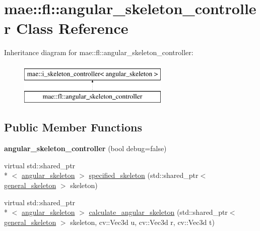 \hypertarget{classmae_1_1fl_1_1angular__skeleton__controller}{\section{mae\-:\-:fl\-:\-:angular\-\_\-skeleton\-\_\-controller Class Reference}
\label{classmae_1_1fl_1_1angular__skeleton__controller}
}
Inheritance diagram for mae\-:\-:fl\-:\-:angular\-\_\-skeleton\-\_\-controller\-:\begin{figure}[H]
\begin{center}
\leavevmode
\includegraphics[height=2.000000cm]{classmae_1_1fl_1_1angular__skeleton__controller}
\end{center}
\end{figure}
\subsection*{Public Member Functions}
\begin{DoxyCompactItemize}
\item 
\hypertarget{classmae_1_1fl_1_1angular__skeleton__controller_a83357968cdb490b9032a32e9fef2765a}{{\bfseries angular\-\_\-skeleton\-\_\-controller} (bool debug=false)}\label{classmae_1_1fl_1_1angular__skeleton__controller_a83357968cdb490b9032a32e9fef2765a}

\item 
virtual std\-::shared\-\_\-ptr\\*
$<$ \hyperlink{classmae_1_1fl_1_1angular__skeleton}{angular\-\_\-skeleton} $>$ \hyperlink{classmae_1_1fl_1_1angular__skeleton__controller_afae922566ff1d48db88538bd4b0c0d19}{specified\-\_\-skeleton} (std\-::shared\-\_\-ptr$<$ \hyperlink{classmae_1_1general__skeleton}{general\-\_\-skeleton} $>$ skeleton)
\item 
virtual std\-::shared\-\_\-ptr\\*
$<$ \hyperlink{classmae_1_1fl_1_1angular__skeleton}{angular\-\_\-skeleton} $>$ \hyperlink{classmae_1_1fl_1_1angular__skeleton__controller_a8ef9c285e21b340faad2b1304cd25c4e}{calculate\-\_\-angular\-\_\-skeleton} (std\-::shared\-\_\-ptr$<$ \hyperlink{classmae_1_1general__skeleton}{general\-\_\-skeleton} $>$ skeleton, cv\-::\-Vec3d u, cv\-::\-Vec3d r, cv\-::\-Vec3d t)
\end{DoxyCompactItemize}
